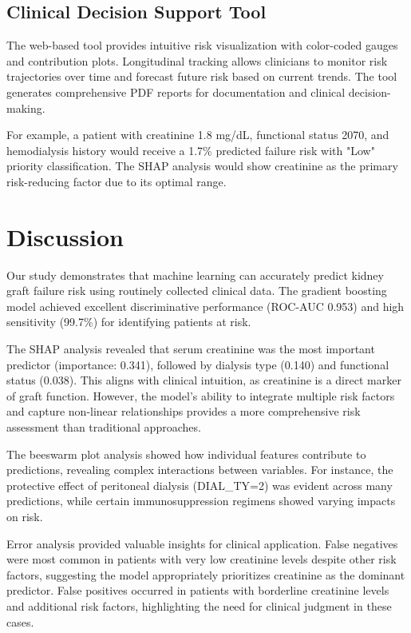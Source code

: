 \documentclass[12pt,a4paper]{article}
\begin{document}
\subsection{Clinical Decision Support Tool}

The web-based tool provides intuitive risk visualization with color-coded gauges and contribution plots. Longitudinal tracking allows clinicians to monitor risk trajectories over time and forecast future risk based on current trends. The tool generates comprehensive PDF reports for documentation and clinical decision-making.

For example, a patient with creatinine 1.8 mg/dL, functional status 2070, and hemodialysis history would receive a 1.7\% predicted failure risk with "Low" priority classification. The SHAP analysis would show creatinine as the primary risk-reducing factor due to its optimal range.

\section{Discussion}

Our study demonstrates that machine learning can accurately predict kidney graft failure risk using routinely collected clinical data. The gradient boosting model achieved excellent discriminative performance (ROC-AUC 0.953) and high sensitivity (99.7\%) for identifying patients at risk.

The SHAP analysis revealed that serum creatinine was the most important predictor (importance: 0.341), followed by dialysis type (0.140) and functional status (0.038). This aligns with clinical intuition, as creatinine is a direct marker of graft function. However, the model's ability to integrate multiple risk factors and capture non-linear relationships provides a more comprehensive risk assessment than traditional approaches.

The beeswarm plot analysis showed how individual features contribute to predictions, revealing complex interactions between variables. For instance, the protective effect of peritoneal dialysis (DIAL\_TY=2) was evident across many predictions, while certain immunosuppression regimens showed varying impacts on risk.

Error analysis provided valuable insights for clinical application. False negatives were most common in patients with very low creatinine levels despite other risk factors, suggesting the model appropriately prioritizes creatinine as the dominant predictor. False positives occurred in patients with borderline creatinine levels and additional risk factors, highlighting the need for clinical judgment in these cases.
\end{document}
